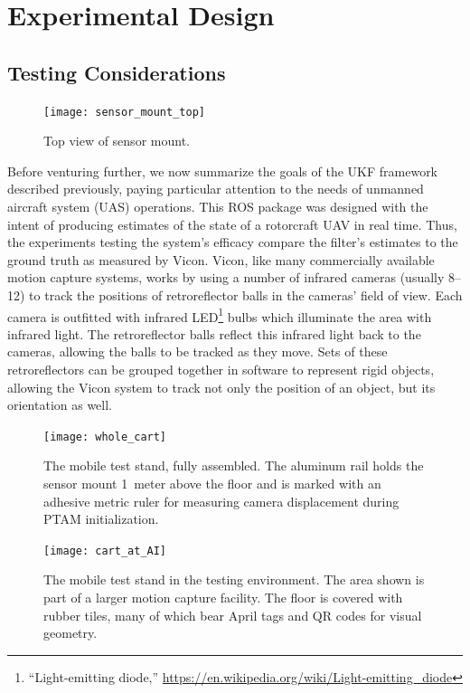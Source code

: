 \chapter{Experimental Design} \label{ch:Exp_Design}

\section{Testing Considerations}

\begin{figure}
        \centering
        \texttt{[image: sensor\_mount\_top]}
        \caption{Top view of sensor mount.}
        \label{fig:sensor_mount_top}
\end{figure}

Before venturing further, we now summarize the goals of the UKF framework described previously, paying particular attention to the needs of unmanned aircraft system (UAS) operations. This ROS package was designed with the intent of producing estimates of the state of a rotorcraft UAV in real time. Thus, the experiments testing the system's efficacy compare the filter's estimates to the ground truth as measured by Vicon. Vicon, like many commercially available motion capture systems, works by using a number of infrared cameras (usually 8--12) to track the positions of retroreflector balls in the cameras' field of view. Each camera is outfitted with infrared LED\footnote{``Light-emitting diode,'' \url{https://en.wikipedia.org/wiki/Light-emitting_diode}} bulbs which illuminate the area with infrared light. The retroreflector balls reflect this infrared light back to the cameras, allowing the balls to be tracked as they move. Sets of these retroreflectors can be grouped together in software to represent rigid objects, allowing the Vicon system to track not only the position of an object, but its orientation as well.

\begin{figure}[t!]
  \centering
    \texttt{[image: whole\_cart]}
  \caption[Mobile Test Stand]{The mobile test stand, fully assembled. The aluminum rail holds the sensor mount 1~meter above the floor and is marked with an adhesive metric ruler for measuring camera displacement during PTAM initialization.}
  \label{fig:whole_cart}
\end{figure}

\begin{figure}
  \centering
    \texttt{[image: cart\_at\_AI]}
  \caption[Testing Environment]{The mobile test stand in the testing environment. The area shown is part of a larger motion capture facility. The floor is covered with rubber tiles, many of which bear April tags and QR codes for visual geometry.}
  \label{fig:cart_at_AI}
\end{figure}

